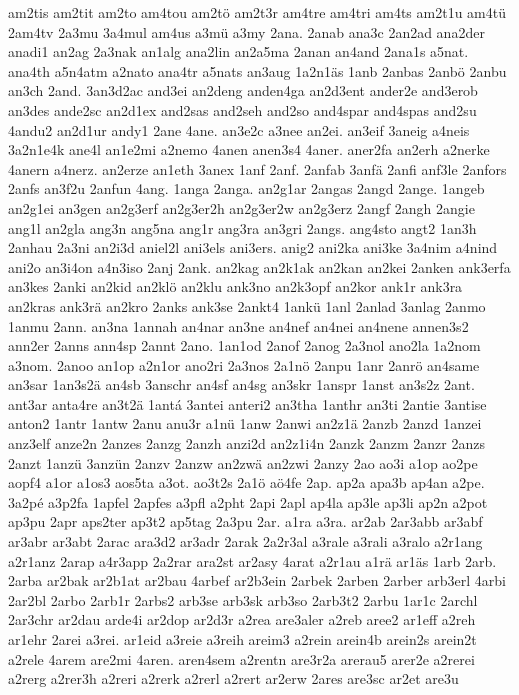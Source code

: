 {am2tis
am2tit
am2to
am4tou
am2tö
am2t3r
am4tre
am4tri
am4ts
am2t1u
am4tü
2am4tv
2a3mu
3a4mul
am4us
a3mü
a3my
2ana.
2anab
ana3c
2an2ad
ana2der
anadi1
an2ag
2a3nak
an1alg
ana2lin
an2a5ma
2anan
an4and
2ana1s
a5nat.
ana4th
a5n4atm
a2nato
ana4tr
a5nats
an3aug
1a2n1äs
1anb
2anbas
2anbö
2anbu
an3ch
2and.
3an3d2ac
and3ei
an2deng
anden4ga
an2d3ent
ander2e
and3erob
an3des
ande2sc
an2d1ex
and2sas
and2seh
and2so
and4spar
and4spas
and2su
4andu2
an2d1ur
andy1
2ane
4ane.
an3e2c
a3nee
an2ei.
an3eif
3aneig
a4neis
3a2n1e4k
ane4l
an1e2mi
a2nemo
4anen
anen3s4
4aner.
aner2fa
an2erh
a2nerke
4anern
a4nerz.
an2erze
an1eth
3anex
1anf
2anf.
2anfab
3anfä
2anfi
anf3le
2anfors
2anfs
an3f2u
2anfun
4ang.
1anga
2anga.
an2g1ar
2angas
2angd
2ange.
1angeb
an2g1ei
an3gen
an2g3erf
an2g3er2h
an2g3er2w
an2g3erz
2angf
2angh
2angie
ang1l
an2gla
ang3n
ang5na
ang1r
ang3ra
an3gri
2angs.
ang4sto
angt2
1an3h
2anhau
2a3ni
an2i3d
aniel2l
ani3els
ani3ers.
anig2
ani2ka
ani3ke
3a4nim
a4nind
ani2o
an3i4on
a4n3iso
2anj
2ank.
an2kag
an2k1ak
an2kan
an2kei
2anken
ank3erfa
an3kes
2anki
an2kid
an2klö
an2klu
ank3no
an2k3opf
an2kor
ank1r
ank3ra
an2kras
ank3rä
an2kro
2anks
ank3se
2ankt4
1ankü
1anl
2anlad
3anlag
2anmo
1anmu
2ann.
an3na
1annah
an4nar
an3ne
an4nef
an4nei
an4nene
annen3s2
ann2er
2anns
ann4sp
2annt
2ano.
1an1od
2anof
2anog
2a3nol
ano2la
1a2nom
a3nom.
2anoo
an1op
a2n1or
ano2ri
2a3nos
2a1nö
2anpu
1anr
2anrö
an4same
an3sar
1an3s2ä
an4sb
3anschr
an4sf
an4sg
an3skr
1anspr
1anst
an3s2z
2ant.
ant3ar
anta4re
an3t2ä
1antá
3antei
anteri2
an3tha
1anthr
an3ti
2antie
3antise
anton2
1antr
1antw
2anu
anu3r
a1nü
1anw
2anwi
an2z1ä
2anzb
2anzd
1anzei
anz3elf
anze2n
2anzes
2anzg
2anzh
anzi2d
an2z1i4n
2anzk
2anzm
2anzr
2anzs
2anzt
1anzü
3anzün
2anzv
2anzw
an2zwä
an2zwi
2anzy
2ao
ao3i
a1op
ao2pe
aopf4
a1or
a1os3
aos5ta
a3ot.
ao3t2s
2a1ö
aö4fe
2ap.
ap2a
apa3b
ap4an
a2pe.
3a2pé
a3p2fa
1apfel
2apfes
a3pfl
a2pht
2api
2apl
ap4la
ap3le
ap3li
ap2n
a2pot
ap3pu
2apr
aps2ter
ap3t2
ap5tag
2a3pu
2ar.
a1ra
a3ra.
ar2ab
2ar3abb
ar3abf
ar3abr
ar3abt
2arac
ara3d2
ar3adr
2arak
2a2r3al
a3rale
a3rali
a3ralo
a2r1ang
a2r1anz
2arap
a4r3app
2a2rar
ara2st
ar2asy
4arat
a2r1au
a1rä
ar1äs
1arb
2arb.
2arba
ar2bak
ar2b1at
ar2bau
4arbef
ar2b3ein
2arbek
2arben
2arber
arb3erl
4arbi
2ar2bl
2arbo
2arb1r
2arbs2
arb3se
arb3sk
arb3so
2arb3t2
2arbu
1ar1c
2archl
2ar3chr
ar2dau
arde4i
ar2dop
ar2d3r
a2rea
are3aler
a2reb
aree2
ar1eff
a2reh
ar1ehr
2arei
a3rei.
ar1eid
a3reie
a3reih
areim3
a2rein
arein4b
arein2s
arein2t
a2rele
4arem
are2mi
4aren.
aren4sem
a2rentn
are3r2a
arerau5
arer2e
a2rerei
a2rerg
a2rer3h
a2reri
a2rerk
a2rerl
a2rert
ar2erw
2ares
are3sc
ar2et
are3u
}
